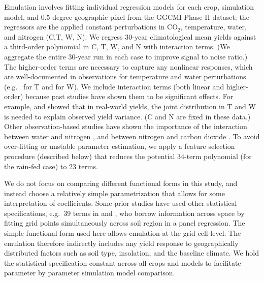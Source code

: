 \documentclass[esd, final]{copernicus} %
\begin{document}
Emulation involves fitting individual regression models for each crop, simulation model, and 0.5 degree geographic pixel from the GGCMI Phase II dataset; the regressors are the applied constant perturbations in CO$_2$, temperature, water, and nitrogen (C,T, W, N).  We regress 30-year climatological mean yields against a third-order polynomial in C, T, W, and N with interaction terms. (We aggregate the entire 30-year run in each case to improve signal to noise ratio.) The higher-order terms are necessary to capture any nonlinear responses, which are well-documented in observations for temperature and water perturbations (e.g.\ \citet{Schlenker2009} for T and \citet{He2016} for W). We include interaction terms (both linear and higher-order) because past studies have shown them to be significant effects. For example, \citet{Lobell2007} and \citet{Tebaldi2008} showed that in real-world yields, the joint distribution in T and W is needed to explain observed yield variance. (C and N are fixed in these data.) Other observation-based studies have shown the importance of the interaction between water and nitrogen \citep[e.g.][]{AULAKH2005}, and between nitrogen and carbon dioxide \citep{Mitsuru92, Nakamura97}. To avoid over-fitting or unstable parameter estimation, we apply a feature selection procedure (described below) that reduces the potential 34-term polynomial (for the rain-fed case) to 23 terms.

We do not focus on comparing different functional forms in this study, and instead choose a relatively simple parametrization that allows for some interpretation of coefficients. Some prior studies have used other statistical specifications, e.g.\ 39 terms in \citet{BLANC2015} and \citet{BLANC2017}, who borrow information across space by fitting grid points simultaneously across soil region in a panel regression. The simple functional form used here allows emulation at the grid cell level. The emulation therefore indirectly includes any yield response to geographically distributed factors such as soil type, insolation, and the baseline climate. We hold the statistical specification constant across all crops and models to facilitate parameter by parameter simulation model comparison.
\end{document}
